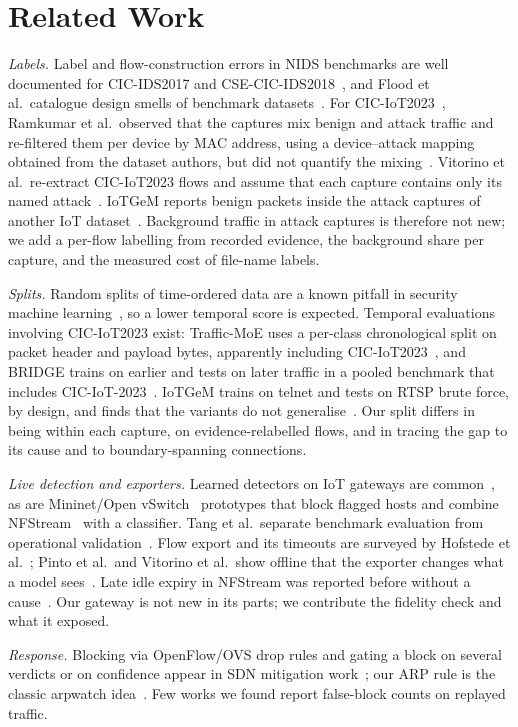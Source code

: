 \section{Related Work}\label{sec:related}

\emph{Labels.} Label and flow-construction errors in NIDS benchmarks are well documented for CIC-IDS2017 and CSE-CIC-IDS2018~\cite{engelen2021troubleshooting,liu2022error}, and Flood et al.\ catalogue design smells of benchmark datasets~\cite{flood2024smells}. For CIC-IoT2023~\cite{neto2023ciciot2023}, Ramkumar et al.\ observed that the captures mix benign and attack traffic and re-filtered them per device by MAC address, using a device--attack mapping obtained from the dataset authors, but did not quantify the mixing~\cite{ramkumar2024diagnosing}. Vitorino et al.\ re-extract CIC-IoT2023 flows and assume that each capture contains only its named attack~\cite{vitorino2025revisiting}. IoTGeM reports benign packets inside the attack captures of another IoT dataset~\cite{kostas2024iotgem}. Background traffic in attack captures is therefore not new; we add a per-flow labelling from recorded evidence, the background share per capture, and the measured cost of file-name labels.

\emph{Splits.} Random splits of time-ordered data are a known pitfall in security machine learning~\cite{arp2022dos,pendlebury2019tesseract,apruzzese2023sok}, so a lower temporal score is expected. Temporal evaluations involving CIC-IoT2023 exist: Traffic-MoE uses a per-class chronological split on packet header and payload bytes, apparently including CIC-IoT2023~\cite{zhou2026trafficmoe}, and BRIDGE trains on earlier and tests on later traffic in a pooled benchmark that includes CIC-IoT-2023~\cite{bridge2026tchnet}. IoTGeM trains on telnet and tests on RTSP brute force, by design, and finds that the variants do not generalise~\cite{kostas2024iotgem}. Our split differs in being within each capture, on evidence-relabelled flows, and in tracing the gap to its cause and to boundary-spanning connections.

\emph{Live detection and exporters.} Learned detectors on IoT gateways are common~\cite{realguard2022}, as are Mininet/Open vSwitch~\cite{lantz2010mininet,pfaff2015ovs} prototypes that block flagged hosts and combine NFStream~\cite{aouini2022nfstream} with a classifier. Tang et al.\ separate benchmark evaluation from operational validation~\cite{tang2026hybrid}. Flow export and its timeouts are surveyed by Hofstede et al.~\cite{hofstede2014flow}; Pinto et al.\ and Vitorino et al.\ show offline that the exporter changes what a model sees~\cite{pinto2025hera,vitorino2025revisiting}. Late idle expiry in NFStream was reported before without a cause~\cite{nfstream120}. Our gateway is not new in its parts; we contribute the fidelity check and what it exposed.

\emph{Response.} Blocking via OpenFlow/OVS drop rules and gating a block on several verdicts or on confidence appear in SDN mitigation work~\cite{bawany2017ddos,yan2016sdn}; our ARP rule is the classic arpwatch idea~\cite{arpwatch}. Few works we found report false-block counts on replayed traffic.
